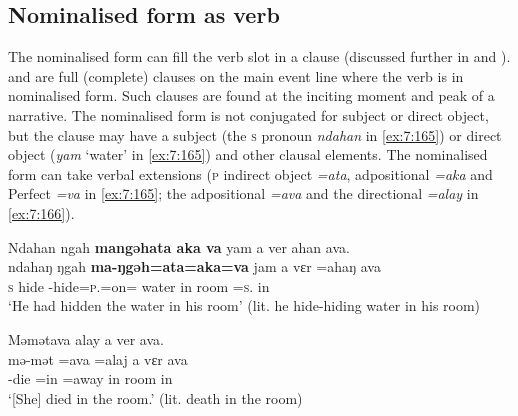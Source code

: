 \subsection{Nominalised form as verb}\label{sec:7.6.2}
\hypertarget{RefHeading1212441525720847}{}
The nominalised form can fill the verb slot in a clause (discussed further in  and ).  and  are full (complete) clauses on the main event line where the verb is in nominalised form. Such clauses are found at the inciting moment and peak of a narrative.  The nominalised form is not conjugated for subject or direct object, but the clause may have a subject (the \textsc{s} pronoun \textit{ndahan} in \ref{ex:7:165}) or direct object (\textit{yam} ‘water’ in \ref{ex:7:165}) and other clausal elements. The nominalised form can take verbal extensions (\textsc{p} indirect object \textit{=ata}, adpositional \textit{=aka} and Perfect \textit{=va} in \ref{ex:7:165}; the adpositional \textit{=ava} and the directional \textit{=alay} in \ref{ex:7:166}). 

\ea\label{ex:7:165}
Ndahan  ngah \textbf{mangəhata  aka  va}  yam  a  ver  ahan  ava.\\
\gll  ndahaŋ  ŋgah \textbf{ma-ŋgəh=ata=aka=va}  jam  a  vɛr  =ahaŋ    ava\\
      \textsc{s}    hide  {\NOM}{}-hide=\textsc{p}.{\IO}=on={\PRF}  water  in  room  =\textsc{s}.{\POSS}  in\\
\glt  ‘He had hidden the water in his room’ (lit. he hide-hiding water in his room)\\
\z 

\ea\label{ex:7:166}
Məmətava  alay  a  ver  ava.\\
\gll  mə-mət  =ava  =alaj    a   vɛr   ava\\
      {\NOM}{}-die  =in  =away    in  room  in\\
\glt  ‘[She] died in the room.’ (lit. death in the room)\\
\z 

